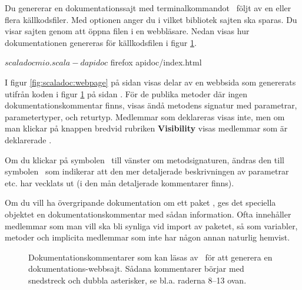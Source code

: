 Du genererar en dokumentationssajt med terminalkommandot \scaladoc\ följt av en eller flera källkodsfiler. Med optionen  anger du i vilket bibliotek sajten ska sparas. Du visar sajten genom att öppna filen  i en webbläsare. Nedan visas hur dokumentationen genereras för källkodsfilen i figur \ref{fig:scaladoc:mio}.
\begin{REPLnonum}
$ scaladoc mio.scala -d apidoc
$ firefox apidoc/index.html
\end{REPLnonum}

I figur \ref{fig:scaladoc:webpage} på sidan \pageref{fig:scaladoc:webpage} visas delar av en webbsida som genererats utifrån koden i figur \ref{fig:scaladoc:mio} på sidan \pageref{fig:scaladoc:mio}. För de publika metoder där ingen dokumentationskommentar finns, visas ändå metodens signatur med parametrar, parametertyper, och returtyp. Medlemmar som deklareras  visas inte, men om man klickar på knappen  bredvid rubriken \textbf{Visibility} visas medlemmar som är deklarerade .

Om du klickar på symbolen \Forward\ till vänster om metodsignaturen, ändras den till symbolen \MoveDown\ som indikerar att den mer detaljerade beskrivningen av parametrar etc. har vecklats ut (i den mån detaljerade kommentarer finns). 

Om du vill ha övergripande dokumentation om ett paket , ges det speciella objektet  en dokumentationskommentar med sådan information. Ofta innehåller  medlemmar som man vill ska bli synliga vid import av paketet, så som variabler, metoder och implicita medlemmar som inte har någon annan naturlig hemvist.

\begin{figure}[b]
    \caption{Dokumentationskommentarer som kan läsas av \scaladoc\ för att generera en dokumentations-webbsajt. Sådana kommentarer börjar  med snedstreck och dubbla asterisker, se bl.a. raderna 8--13 ovan.}
    \label{fig:scaladoc:mio}
\end{figure}

